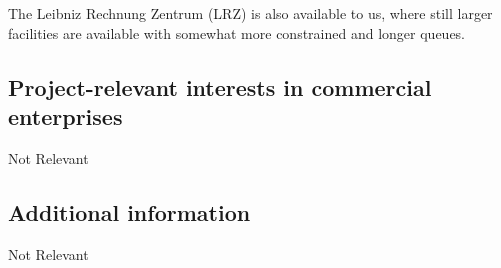\documentclass[10pt,fleqn,twoside]{article}
\newcommand{\Tcol}{\color{blue}}
\begin{document}
The Leibniz Rechnung Zentrum (LRZ) is also available to us, where still
larger facilities are available with somewhat more constrained and longer queues.



\subsection{\Tcol Project-relevant interests in commercial enterprises}

Not Relevant


\subsection{\Tcol Additional information}

Not Relevant
\end{document}
